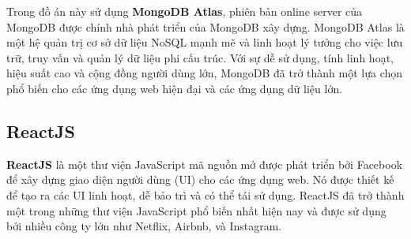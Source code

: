 Trong đồ án này sử dụng \textbf{MongoDB Atlas}, phiên bản online server của MongoDB được chính nhà phát triển của MongoDB xây dựng. MongoDB Atlas là một hệ quản trị cơ sở dữ liệu NoSQL mạnh mẽ và linh hoạt lý tưởng cho việc lưu trữ, truy vấn và quản lý dữ liệu phi cấu trúc. Với sự dễ sử dụng, tính linh hoạt, hiệu suất cao và cộng đồng người dùng lớn, MongoDB đã trở thành một lựa chọn phổ biến cho các ứng dụng web hiện đại và các ứng dụng dữ liệu lớn.

\subsection{ReactJS}

\textbf{ReactJS} là một thư viện JavaScript mã nguồn mở được phát triển bởi Facebook để xây dựng giao diện người dùng (UI) cho các ứng dụng web. Nó được thiết kế để tạo ra các UI linh hoạt, dễ bảo trì và có thể tái sử dụng. ReactJS đã trở thành một trong những thư viện JavaScript phổ biến nhất hiện nay và được sử dụng bởi nhiều công ty lớn như Netflix, Airbnb, và Instagram.

